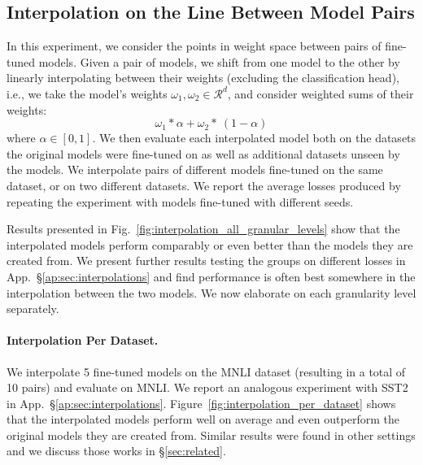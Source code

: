 \documentclass[nohyperref]{article}
\theoremstyle{plain}
\theoremstyle{definition}
\theoremstyle{remark}
\begin{document}
\subsection{Interpolation on the Line Between Model Pairs} \label{sec:interpolations}
In this experiment, we consider the points in weight space between pairs of fine-tuned models. Given a pair of models, we shift from one model to the other by linearly interpolating between their weights (excluding the classification head), i.e., we take the model's weights $\omega_{1},\omega_{2}\in\mathcal{R}^d$, and consider weighted sums of their weights: 
\begin{equation}\label{equation:weighted_avg}
\omega_{1} * \alpha + \omega_{2} * \ (1-\alpha) 
\end{equation}
where $ \alpha \in [0,1]$.
We then evaluate each interpolated model both on the datasets the original models were fine-tuned on as well as additional datasets unseen by the models. 
We interpolate pairs of different models fine-tuned on the same dataset, or on two different datasets.
We report the average losses produced by repeating the experiment with models fine-tuned with different seeds.

Results presented in Fig.~\ref{fig:interpolation_all_granular_levels} show that the interpolated models perform comparably or even better than the models they are created from. We present further results testing the groups on different losses in App.~\S\ref{ap:sec:interpolations} and find performance is often best somewhere in the interpolation between the two models. 
We now elaborate on each granularity level separately. 


\paragraph{Interpolation Per Dataset.} We interpolate 5 fine-tuned models on the MNLI dataset (resulting in a total of 10 pairs) and evaluate on MNLI. We report an analogous experiment with SST2 in App.~\S\ref{ap:sec:interpolations}.
Figure~\ref{fig:interpolation_per_dataset} shows that the interpolated models perform well on average and even outperform the original models they are created from. Similar results were found in other settings \citep[e.g.;][]{Wortsman2022ModelSA} and we discuss those works in \S\ref{sec:related}.
\end{document}
